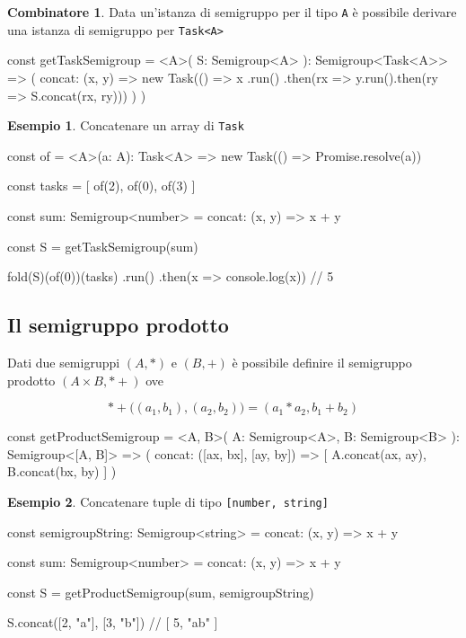 \documentclass[12pt]{article}
\theoremstyle{definition}
\newtheorem{example}{Esempio}[section]
\newtheorem{combinator}{Combinatore}[section]
\newenvironment{code}
  {\vspace{0.5cm} \VerbatimEnvironment\begin{typescriptcode}}
  {\end{typescriptcode} \vspace{0.2cm}}
\begin{document}
\begin{combinator}
Data un'istanza di semigruppo per il tipo \texttt{A} è possibile derivare una istanza di semigruppo per \texttt{Task<A>}

\begin{code}
const getTaskSemigroup = <A>(
  S: Semigroup<A>
): Semigroup<Task<A>> => ({
  concat: (x, y) =>
    new Task(() =>
      x
        .run()
        .then(rx => y.run().then(ry => S.concat(rx, ry)))
    )
})
\end{code}
\end{combinator}

\begin{example}
Concatenare un array di \texttt{Task}

\begin{code}
const of = <A>(a: A): Task<A> =>
  new Task(() => Promise.resolve(a))

const tasks = [
  of(2),
  of(0),
  of(3)
]

const sum: Semigroup<number> = {
  concat: (x, y) => x + y
}

const S = getTaskSemigroup(sum)

fold(S)(of(0))(tasks)
  .run()
  .then(x => console.log(x)) // 5
\end{code}
\end{example}

\subsection{Il semigruppo prodotto}

Dati due semigruppi $(A, *)$ e $(B, +)$ è possibile definire il semigruppo prodotto $(A \times B, *+)$ ove

$$
*+\Big((a_1, b_1), (a_2, b_2)\Big) = (a_1 * a_2, b_1 + b_2)
$$

\begin{code}
const getProductSemigroup = <A, B>(
  A: Semigroup<A>,
  B: Semigroup<B>
): Semigroup<[A, B]> => ({
  concat: ([ax, bx], [ay, by]) => [
    A.concat(ax, ay),
    B.concat(bx, by)
  ]
})
\end{code}

\begin{example}
Concatenare tuple di tipo \texttt{[number, string]}

\begin{code}
const semigroupString: Semigroup<string> = {
  concat: (x, y) => x + y
}

const sum: Semigroup<number> = {
  concat: (x, y) => x + y
}

const S = getProductSemigroup(sum, semigroupString)

S.concat([2, "a"], [3, "b"])
// [ 5, "ab" ]
\end{code}
\end{example}
\end{document}
